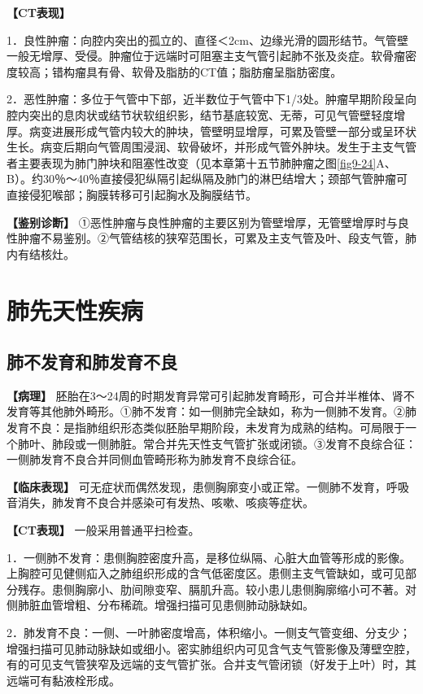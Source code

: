 \textbf{【CT表现】}

1．良性肿瘤：向腔内突出的孤立的、直径＜2cm、边缘光滑的圆形结节。气管壁一般无增厚、受侵。肿瘤位于远端时可阻塞主支气管引起肺不张及炎症。软骨瘤密度较高；错构瘤具有骨、软骨及脂肪的CT值；脂肪瘤呈脂肪密度。

2．恶性肿瘤：多位于气管中下部，近半数位于气管中下1/3处。肿瘤早期阶段呈向腔内突出的息肉状或结节状软组织影，结节基底较宽、无蒂，可见气管壁轻度增厚。病变进展形成气管内较大的肿块，管壁明显增厚，可累及管壁一部分或呈环状生长。病变后期向气管周围浸润、软骨破坏，并形成气管外肿块。发生于主支气管者主要表现为肺门肿块和阻塞性改变（见本章第十五节肺肿瘤之图\ref{fig9-24}A、B）。约30％～40％直接侵犯纵隔引起纵隔及肺门的淋巴结增大；颈部气管肿瘤可直接侵犯喉部；胸膜转移可引起胸水及胸膜结节。

\textbf{【鉴别诊断】}
①恶性肿瘤与良性肿瘤的主要区别为管壁增厚，无管壁增厚时与良性肿瘤不易鉴别。②气管结核的狭窄范围长，可累及主支气管及叶、段支气管，肺内有结核灶。

\section{肺先天性疾病}

\subsection{肺不发育和肺发育不良}

\textbf{【病理】}
胚胎在3～24周的时期发育异常可引起肺发育畸形，可合并半椎体、肾不发育等其他肺外畸形。①肺不发育：如一侧肺完全缺如，称为一侧肺不发育。②肺发育不良：是指肺组织形态类似胚胎早期阶段，未发育为成熟的结构。可局限于一个肺叶、肺段或一侧肺脏。常合并先天性支气管扩张或闭锁。③发育不良综合征：一侧肺发育不良合并同侧血管畸形称为肺发育不良综合征。

\textbf{【临床表现】}
可无症状而偶然发现，患侧胸廓变小或正常。一侧肺不发育，呼吸音消失，肺发育不良合并感染可有发热、咳嗽、咳痰等症状。

\textbf{【CT表现】} 一般采用普通平扫检查。

1．一侧肺不发育：患侧胸腔密度升高，是移位纵隔、心脏大血管等形成的影像。上胸腔可见健侧疝入之肺组织形成的含气低密度区。患侧主支气管缺如，或可见部分残存。患侧胸廓小、肋间隙变窄、膈肌升高。较小患儿患侧胸廓缩小可不著。对侧肺脏血管增粗、分布稀疏。增强扫描可见患侧肺动脉缺如。

2．肺发育不良：一侧、一叶肺密度增高，体积缩小。一侧支气管变细、分支少；增强扫描可见肺动脉缺如或细小。密实肺组织内可见含气支气管影像及薄壁空腔，有的可见支气管狭窄及远端的支气管扩张。合并支气管闭锁（好发于上叶）时，其远端可有黏液栓形成。


